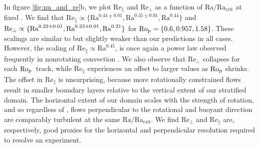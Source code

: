 In figure \ref{fig:nu_and_re}b, we plot $\text{Re}_{\parallel}$ and $\text{Re}_{\perp}$
as a function of Ra$/\text{Ra}_{\text{crit}}$ at fixed \pro. We find that $\text{Re}_\parallel \propto \{\text{Ra}^{0.44 \pm 0.01}, \text{Ra}^{0.45 \pm 0.01}, \text{Ra}^{0.44}\}$
and $\text{Re}_\perp \propto \{\text{Ra}^{0.22 \pm 0.01}, \\ \text{Ra}^{0.23 \pm 0.01}, \text{Ra}^{0.21}\}$ for
$\text{Ro}_{\text{p}} = \{0.6, 0.957, 1.58\}$. These scalings are similar to but slightly weaker than our
predictions in all cases. However, the scaling of $\text{Re}_{\parallel} \propto \text{Ra}^{0.45}$, 
is once again a power law observed frequently in nonrotating convection \citep[][\AB]{ahlers&all2009}.
We also observe that $\text{Re}_{\perp}$ collapses for each $\text{Ro}_{\text{p}}\,$ track,
while $\text{Re}_{\parallel}$ experiences an offset
to larger values as $\text{Ro}_{\text{p}}$ shrinks. The offset in $\text{Re}_{\parallel}$ is unsurprising, 
because more rotationally constrained flows result in smaller boundary layers relative to the 
vertical extent of our stratified domain. The horizontal extent of our domain scales with the
strength of rotation, and so regardless of \pro, flows perpendicular
to the rotational and buoyant direction are comparably turbulent at the same 
$\text{Ra}/\text{Ra}_\text{crit}$.
We find $\text{Re}_{\perp}$ and $\text{Re}_{\parallel}$ are, respectively, good proxies for
the horizontal and perpendicular resolution required to resolve an experiment.

